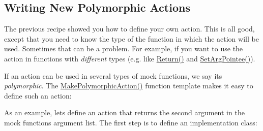\subsection*{Writing New Polymorphic Actions}

The previous recipe showed you how to define your own action. This is all good, except that you need to know the type of the function in which the action will be used. Sometimes that can be a problem. For example, if you want to use the action in functions with {\itshape different} types (e.\+g. like {\ttfamily \mbox{\hyperlink{namespacetesting_adae3994eb444d1ad2dd602454b854663}{Return()}}} and {\ttfamily \mbox{\hyperlink{namespacetesting_a6dbe77dc170c495ea300dd9d74ed4595}{Set\+Arg\+Pointee()}}}).

If an action can be used in several types of mock functions, we say it\textquotesingle{}s {\itshape polymorphic}. The {\ttfamily \mbox{\hyperlink{namespacetesting_a45df529b8166936d970884383f0ede82}{Make\+Polymorphic\+Action()}}} function template makes it easy to define such an action\+:


\begin{DoxyCode}{0}
\DoxyCodeLine{}
\DoxyCodeLine{}
\DoxyCodeLine{\}  \textcolor{comment}{// namespace testing}}
\end{DoxyCode}


As an example, let\textquotesingle{}s define an action that returns the second argument in the mock function\textquotesingle{}s argument list. The first step is to define an implementation class\+:


\begin{DoxyCode}{0}
\DoxyCodeLine{ \textcolor{keyword}{public}:}
\DoxyCodeLine{    \textcolor{comment}{// To get the i-th (0-based) argument, use ::testing::get<i>(args).}}
\DoxyCodeLine{  \}}
\DoxyCodeLine{\};}
\end{DoxyCode}


